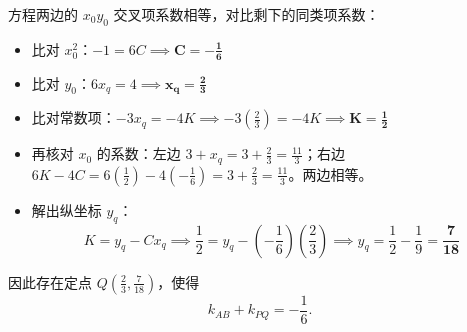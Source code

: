 \begin{solution}
\begin{itemize}
\end{itemize}
方程两边的 $x_0 y_0$ 交叉项系数相等，对比剩下的同类项系数：
\begin{itemize}
\item 比对 $x_0^2$：$-1 = 6C \implies \mathbf{C = -\frac{1}{6}}$
\item 比对 $y_0$：$6x_q = 4 \implies \mathbf{x_q = \frac{2}{3}}$
\item 比对常数项：$-3x_q = -4K \implies -3\left(\frac{2}{3}\right) = -4K \implies \mathbf{K = \frac{1}{2}}$
\item 再核对 $x_0$ 的系数：左边 $3 + x_q = 3 + \frac{2}{3} = \frac{11}{3}$；右边 $6K - 4C = 6\left(\frac{1}{2}\right) - 4\left(-\frac{1}{6}\right) = 3 + \frac{2}{3} = \frac{11}{3}$。两边相等。
\item 解出纵坐标 $y_q$：$$K = y_q - C x_q \implies \frac{1}{2} = y_q - \left(-\frac{1}{6}\right)\left(\frac{2}{3}\right) \implies y_q = \frac{1}{2} - \frac{1}{9} = \mathbf{\frac{7}{18}}$$
\end{itemize}
因此存在定点 $Q\left(\frac{2}{3}, \frac{7}{18}\right)$，使得
$$k_{AB} + k_{PQ} = -\frac{1}{6}.$$
\end{solution}

